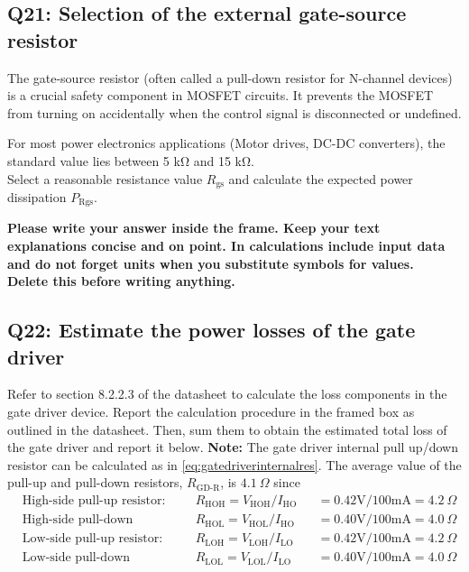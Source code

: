 \documentclass{PELsmallreport}
\begin{document}
\subsection{Q21: Selection of the external gate-source resistor}
The gate-source resistor (often called a pull-down resistor for N-channel devices) is a crucial safety component in MOSFET circuits. It prevents the MOSFET from turning on accidentally when the control signal is disconnected or undefined. 

For most power electronics applications (Motor drives, DC-DC converters), the standard value lies between 5 kΩ and 15 kΩ. \\
Select a reasonable resistance value $R_\text{gs}$ and calculate the expected power dissipation $P_\text{Rgs}$. 
\begin{framed}
	\vspace{2em}
	\textbf{Please write your answer inside the frame. Keep your text explanations concise and on point. In calculations include input data and do not forget units when you substitute symbols for values. \\ Delete this before writing anything.}
	\vspace{2em}
\end{framed}
 \quad {}\hfill{}

\subsection{Q22: Estimate the power losses of the gate driver}
Refer to section 8.2.2.3 of the datasheet to calculate the loss components in the gate driver device. Report the calculation procedure in the framed box as outlined in the datasheet. Then, sum them to obtain the estimated total loss of the gate driver and report it below. 
\medskip
\textbf{Note:} The gate driver internal pull up/down resistor can be calculated as in \eqref{eq:gatedriverinternalres}. The average value of the pull-up and pull-down resistors, $R_\text{GD-R}$, is $4.1  \:\Omega$ since
\begin{equation}
    \begin{split}
        &\text{High-side pull-up resistor:}\quad &&R_\text{HOH} = V_\text{HOH}/I_\text{HO} &&= 0.42\text{V}/100\text{mA} = 4.2 \: \Omega\\
        &\text{High-side pull-down resistor:}\quad &&R_\text{HOL} = V_\text{HOL}/I_\text{HO}&&= 0.40\text{V}/100\text{mA} = 4.0  \:\Omega\\
        &\text{Low-side pull-up resistor:}\quad &&R_\text{LOH} = V_\text{LOH}/I_\text{LO}&&= 0.42\text{V}/100\text{mA} = 4.2  \:\Omega\\
        &\text{Low-side pull-down resistor:}\quad &&R_\text{LOL} = V_\text{LOL}/I_\text{LO}&&= 0.40\text{V}/100\text{mA} = 4.0  \:\Omega\\
    \end{split}
    \label{eq:gatedriverinternalres}
\end{equation}
\end{document}

